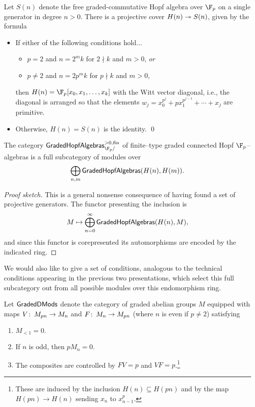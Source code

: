 \begin{theorem}
Let $S(n)$ denote the free graded-commutative Hopf algebra over $\F_p$ on a single generator in degree $n > 0$.  There is a projective cover $H(n) \twoheadrightarrow S(n)$, given by the formula
\begin{itemize}
\item If either of the following conditions hold...
\begin{itemize}
\item $p = 2$ and $n = 2^m k$ for $2 \nmid k$ and $m > 0$, \emph{or}
\item $p \ne 2$ and $n = 2p^m k$ for $p \nmid k$ and $m > 0$,
\end{itemize}
then $H(n) = \F_p[x_0, x_1, \ldots, x_k]$ with the Witt vector diagonal, i.e., the diagonal is arranged so that the elements $w_j = x_0^{p^j} + p x_1^{p^{j-1}} + \cdots + x_j$ are primitive.
\item Otherwise, $H(n) = S(n)$ is the identity.
\qed
\end{itemize}
\end{theorem}

\begin{corollary}
The category $\CatOf{GradedHopfAlgebras}^{> 0, \fin}_{\F_p/}$ of finite--type graded connected Hopf $\F_p$--algebras is a full subcategory of modules over \[\bigoplus_{n, m} \mathsf{GradedHopfAlgebras}(H(n), H(m)).\]
\end{corollary}
\begin{proof}[Proof sketch]
This is a general nonsense consequence of having found a set of projective generators.  The functor presenting the inclusion is \[M \mapsto \bigoplus_{n=0}^\infty \mathsf{GradedHopfAlgebras}(H(n), M),\] and since this functor is corepresented its automorphisms are encoded by the indicated ring.
\end{proof}

We would also like to give a set of conditions, analogous to the technical conditions appearing in the previous two presentations, which select this full subcategory out from all possible modules over this endomorphism ring.

\begin{definition}
Let $\mathsf{GradedDMods}$ denote the category of graded abelian groups $M$ equipped with maps $V\colon\thinspace M_{pn} \to M_n$ and $F\colon\thinspace M_n \to M_{pn}$ (where $n$ is even if $p \ne 2$) satisfying
\begin{enumerate}
\item $M_{< 1} = 0$.
\item If $n$ is odd, then $pM_n = 0$.
\item The composites are controlled by $FV = p$ and $VF = p$.\footnote{These are induced by the inclusion $H(n) \subseteq H(pn)$ and by the map $H(pn) \to H(n)$ sending $x_n$ to $x_{n-1}^p$.}
\end{enumerate}
\end{definition}

